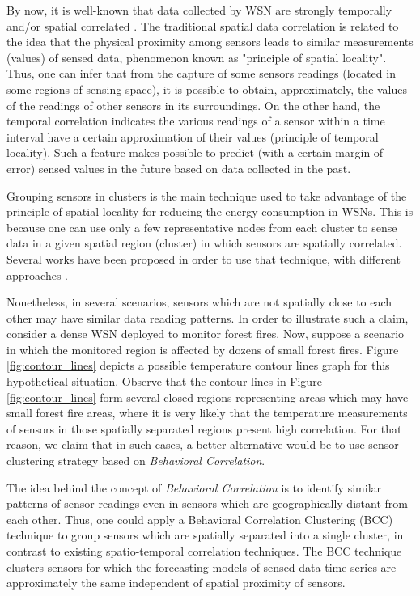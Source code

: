 \documentclass[conference]{IEEEtran}
\begin{document}
By now, it is well-known that data collected by WSN are strongly temporally
and/or spatial correlated \cite{Yoon2005, Chu2006}. The traditional spatial data
correlation is related to the idea that the physical proximity among sensors
leads to similar measurements (values) of sensed data, phenomenon known as
"principle of spatial locality". Thus, one can infer that from the capture of
some sensors readings (located in some regions of sensing space), it is possible
to obtain, approximately, the values of the readings of other sensors in its
surroundings. On the other hand, the temporal correlation indicates the various
readings of a sensor within a time interval have a certain approximation of
their values (principle of temporal locality). Such a feature makes possible to
predict (with a certain margin of error) sensed values in the future based on
data collected in the past.

Grouping sensors in clusters is the main technique used to take advantage of the
principle of spatial locality for reducing the energy consumption in WSNs. This
is because one can use only a few representative nodes from each cluster to
sense data in a given spatial region (cluster) in which sensors are spatially
correlated.
Several works have been proposed in order to use that technique, with different
approaches \cite{Chu2006, Villas2012, Singh2010, Liu2007, Shah2007}.

Nonetheless, in several scenarios, sensors which are not spatially close to each
other may have similar data reading patterns. In order to illustrate such a
claim, consider a dense WSN deployed to monitor forest fires. 
Now, suppose a scenario in which the monitored region is affected by dozens of
small forest fires. Figure \ref{fig:contour_lines} depicts a possible temperature
contour lines graph for this hypothetical situation. Observe that the contour
lines in Figure \ref{fig:contour_lines} form several closed regions representing
areas which may have small forest fire areas, where it is very likely that the
temperature measurements of sensors in those spatially separated regions present
high correlation. For that reason, we claim that in such cases, a better
alternative would be to use sensor clustering strategy based on
\textit{Behavioral Correlation}.

The idea behind the concept of {\it Behavioral Correlation} is to identify
similar patterns of sensor readings even in sensors which are geographically
distant from each other. Thus, one could apply a Behavioral Correlation
Clustering (BCC) technique to group sensors which are spatially separated into a
single cluster, in contrast to existing spatio-temporal correlation techniques.
The BCC technique clusters sensors for which the forecasting models of sensed
data time series are approximately the same independent of spatial proximity of
sensors.
\end{document}
